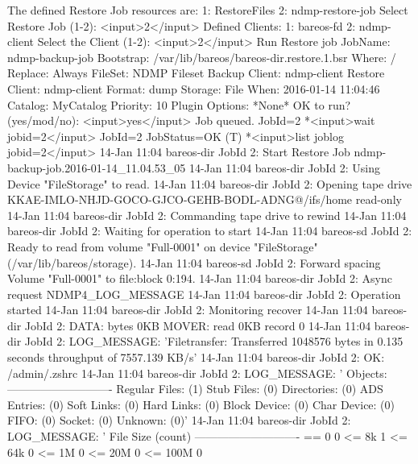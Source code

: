 \begin{bconsole}{}
The defined Restore Job resources are:
     1: RestoreFiles
     2: ndmp-restore-job
Select Restore Job (1-2): <input>2</input>
Defined Clients:
     1: bareos-fd
     2: ndmp-client
Select the Client (1-2): <input>2</input>
Run Restore job
JobName:         ndmp-backup-job
Bootstrap:       /var/lib/bareos/bareos-dir.restore.1.bsr
Where:           /
Replace:         Always
FileSet:         NDMP Fileset
Backup Client:   ndmp-client
Restore Client:  ndmp-client
Format:          dump
Storage:         File
When:            2016-01-14 11:04:46
Catalog:         MyCatalog
Priority:        10
Plugin Options:  *None*
OK to run? (yes/mod/no): <input>yes</input>
Job queued. JobId=2
*<input>wait jobid=2</input>
JobId=2
JobStatus=OK (T)
*<input>list joblog jobid=2</input>
14-Jan 11:04 bareos-dir JobId 2: Start Restore Job ndmp-backup-job.2016-01-14_11.04.53_05
14-Jan 11:04 bareos-dir JobId 2: Using Device "FileStorage" to read.
14-Jan 11:04 bareos-dir JobId 2: Opening tape drive KKAE-IMLO-NHJD-GOCO-GJCO-GEHB-BODL-ADNG@/ifs/home read-only
14-Jan 11:04 bareos-dir JobId 2: Commanding tape drive to rewind
14-Jan 11:04 bareos-dir JobId 2: Waiting for operation to start
14-Jan 11:04 bareos-sd JobId 2: Ready to read from volume "Full-0001" on device "FileStorage" (/var/lib/bareos/storage).
14-Jan 11:04 bareos-sd JobId 2: Forward spacing Volume "Full-0001" to file:block 0:194.
14-Jan 11:04 bareos-dir JobId 2: Async request NDMP4_LOG_MESSAGE
14-Jan 11:04 bareos-dir JobId 2: Operation started
14-Jan 11:04 bareos-dir JobId 2: Monitoring recover
14-Jan 11:04 bareos-dir JobId 2: DATA: bytes 0KB  MOVER: read 0KB record 0
14-Jan 11:04 bareos-dir JobId 2: LOG_MESSAGE: 'Filetransfer: Transferred 1048576 bytes in 0.135 seconds throughput of 7557.139 KB/s'
14-Jan 11:04 bareos-dir JobId 2: OK: /admin/.zshrc
14-Jan 11:04 bareos-dir JobId 2: LOG_MESSAGE: '
        Objects:
        ----------------------------
        Regular Files:          (1)
        Stub Files:             (0)
        Directories:            (0)
        ADS Entries:            (0)
        Soft Links:             (0)
        Hard Links:             (0)
        Block Device:           (0)
        Char Device:            (0)
        FIFO:                   (0)
        Socket:                 (0)
        Unknown:                (0)'
14-Jan 11:04 bareos-dir JobId 2: LOG_MESSAGE: '
        File Size (count)
        ----------------------------
        == 0                    0
        <= 8k                   1
        <= 64k                  0
        <= 1M                   0
        <= 20M                  0
        <= 100M                 0

\end{bconsole}
